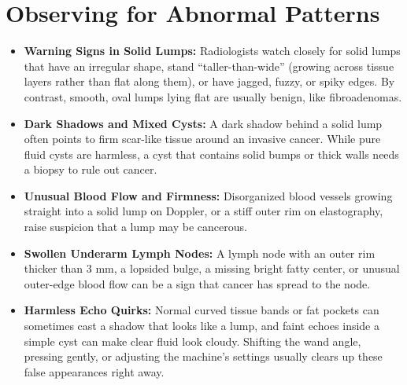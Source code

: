 \section{Observing for Abnormal Patterns}
\begin{itemize}
\item \textbf{Warning Signs in Solid Lumps:} Radiologists watch closely for solid lumps that have an irregular shape, stand ``taller-than-wide'' (growing across tissue layers rather than flat along them), or have jagged, fuzzy, or spiky edges. By contrast, smooth, oval lumps lying flat are usually benign, like fibroadenomas.
\item \textbf{Dark Shadows and Mixed Cysts:} A dark shadow behind a solid lump often points to firm scar-like tissue around an invasive cancer. While pure fluid cysts are harmless, a cyst that contains solid bumps or thick walls needs a biopsy to rule out cancer.
\item \textbf{Unusual Blood Flow and Firmness:} Disorganized blood vessels growing straight into a solid lump on Doppler, or a stiff outer rim on elastography, raise suspicion that a lump may be cancerous.
\item \textbf{Swollen Underarm Lymph Nodes:} A lymph node with an outer rim thicker than 3 mm, a lopsided bulge, a missing bright fatty center, or unusual outer-edge blood flow can be a sign that cancer has spread to the node.
\item \textbf{Harmless Echo Quirks:} Normal curved tissue bands or fat pockets can sometimes cast a shadow that looks like a lump, and faint echoes inside a simple cyst can make clear fluid look cloudy. Shifting the wand angle, pressing gently, or adjusting the machine's settings usually clears up these false appearances right away.
\end{itemize}

